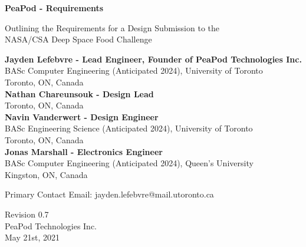 \documentclass{report}
\begin{document}
\begin{titlepage}
    \begin{center}
        \vspace*{1.2cm}

        \textbf{\large{PeaPod - Requirements}}

        \vspace{0.5cm}

        Outlining the Requirements for a Design Submission to the \\NASA/CSA Deep Space Food Challenge

        \vfill \small{

            \textbf{Jayden Lefebvre - Lead Engineer, Founder of PeaPod Technologies Inc.}\\
            BASc Computer Engineering (Anticipated 2024), University of Toronto\\
            Toronto, ON, Canada\\
            \vspace{.5cm}
            \textbf{Nathan Chareunsouk - Design Lead}\\Toronto, ON, Canada\\
            \vspace{.5cm}
            \textbf{Navin Vanderwert - Design Engineer}\\
            BASc Engineering Science (Anticipated 2024), University of Toronto\\
            Toronto, ON, Canada\\
            \vspace{.5cm}
            \textbf{Jonas Marshall - Electronics Engineer}\\
            BASc Computer Engineering (Anticipated 2024), Queen's University\\
            Kingston, ON, Canada

        }

        \vspace{1cm}

        Primary Contact Email: jayden.lefebvre@mail.utoronto.ca

        \vspace{.75cm}

        Revision 0.7\\
        PeaPod Technologies Inc.\\
        May 21st, 2021

    \end{center}
\end{titlepage}
\end{document}
